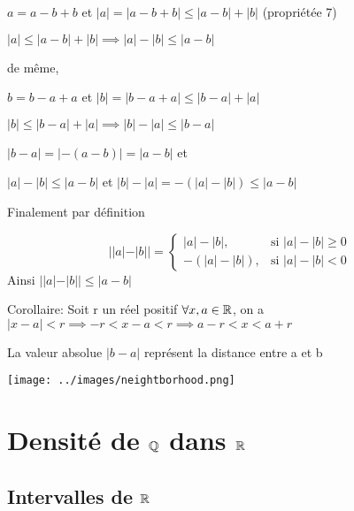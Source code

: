 \documentclass[a4paper, 12pt]{article}
\begin{document}
\begin{demonstration}
    $a = a - b + b$ \quad et \quad $|a| = |a - b + b| \leq |a - b| + |b|$ (propriétée 7)

    $|a| \leq |a - b| + |b| \implies |a| - |b| \leq |a - b|$

    \vspace{0.5em}
    de même, 
    \vspace{0.5em}
    
    $b = b - a + a$ \quad et \quad $|b| = |b - a + a| \leq |b - a| + |a|$
    
    $|b| \leq |b - a| + |a| \implies |b| - |a| \leq |b - a|$
    
    \vspace{0.5em}

    $|b - a| = |-(a-b)| = |a-b|$ et
    
    $|a| - |b| \leq |a-b|$ \quad et \quad $|b| - |a| = -(|a| - |b|) \leq |a-b|$

    Finalement par définition

    \begin{rdem}
        \begin{equation*}
            ||a|-|b|| =
            \begin{cases}
                |a| - |b|, & \text{si } |a| - |b| \geq 0 \\
                -(|a| - |b|), & \text{si } |a| - |b| \lt 0
            \end{cases}
        \end{equation*}
        Ainsi $||a| - |b|| \leq |a - b|$
    \end{rdem}
\end{demonstration}

Corollaire: Soit r un réel positif $\forall x, a \in \mathbb{R}$, on a 
$|x - a| \lt r \implies -r \lt x - a \lt r \implies a-r \lt x \lt a + r$

\begin{remark}
    La valeur absolue $|b - a|$ représent la distance entre a et b
\end{remark}

\texttt{[image: ../images/neightborhood.png]}

\section{Densité de $\mathbb{Q}$ dans $\mathbb{R}$}

\subsection{Intervalles de $\mathbb{R}$}
\end{document}

